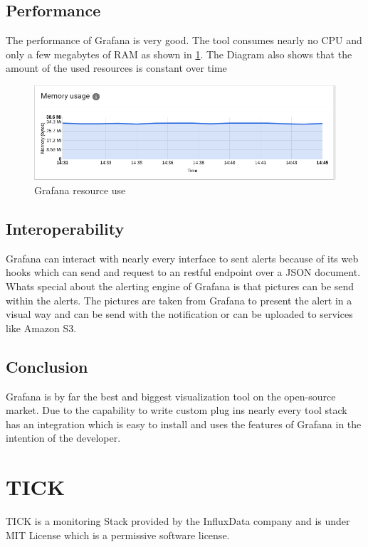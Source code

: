 \subsection{Performance}
The performance of Grafana is very good. The tool consumes nearly no CPU and only a few megabytes of RAM as shown in \cref{fig:Grafan_RAM}. The Diagram also shows that the amount of the used resources is constant over time
\begin{figure}
\centering
\includegraphics[width=1\textwidth]{Bilder/Performance/Grafan_RAM}
\caption{Grafana resource use}
\label{fig:Grafan_RAM}
\end{figure}
\subsection{Interoperability}
Grafana can interact with nearly every interface to sent alerts because of its web hooks which can send and request to an restful endpoint over a JSON document. Whats special about the alerting engine of Grafana is that pictures can be send within the alerts. The pictures are taken from Grafana to present the alert in a visual way and can be send with the notification or can be uploaded to services like Amazon S3.

\subsection{Conclusion}
Grafana is by far the best and biggest visualization tool on the open-source market. Due to the capability to write custom plug ins nearly every tool stack has an integration which is easy to install and uses the features of Grafana in the intention of the developer.

\section{TICK}
\label{tick}
TICK is a monitoring Stack provided by the InfluxData company \cite{tick} and is under MIT License which is a permissive software license.
